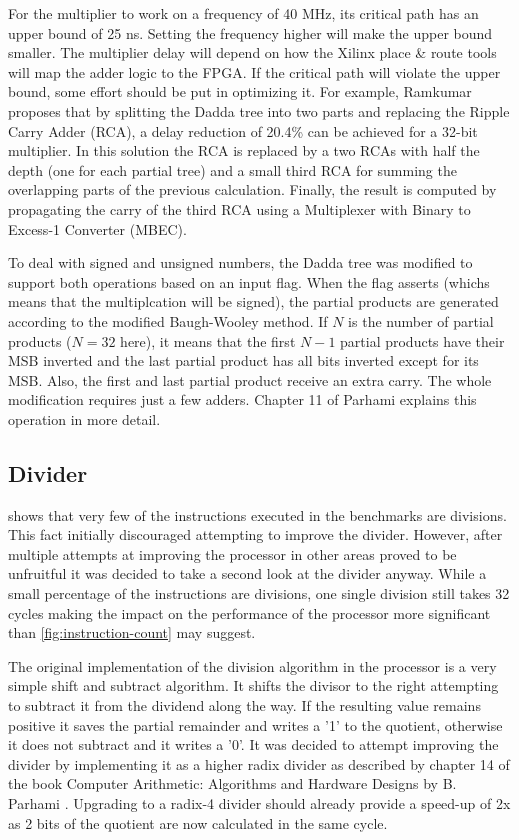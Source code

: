 \documentclass[final]{article}
\begin{document}
For the multiplier to work on a frequency of 40 MHz, its critical path has an upper bound of 25 ns. Setting the frequency higher will make the upper bound smaller. The multiplier delay will depend on how the Xilinx place \& route tools will map the adder logic to the FPGA. If the critical path will violate the upper bound, some effort should be put in optimizing it. For example, Ramkumar \cite{ramkumar} proposes that by splitting the Dadda tree into two parts and replacing the Ripple Carry Adder (RCA), a delay reduction of 20.4\% can be achieved for a 32-bit multiplier. In this solution the RCA is replaced by a two RCAs with half the depth (one for each partial tree) and a small third RCA for summing the overlapping parts of the previous calculation. Finally, the result is computed by propagating the carry of the third RCA using a Multiplexer with Binary to Excess-1 Converter (MBEC).

To deal with signed and unsigned numbers, the Dadda tree was modified to support both operations based on an input flag. When the flag asserts (whichs means that the multiplcation will be signed), the partial products are generated according to the modified Baugh-Wooley method. If $N$ is the number of partial products ($N=32$ here), it means that the first $N-1$ partial products have their MSB inverted and the last partial product has all bits inverted except for its MSB. Also, the first and last partial product receive an extra carry. The whole modification requires just a few adders. Chapter 11 of Parhami \cite{parhami} explains this operation in more detail.

\subsection{Divider}
 shows that very few of the instructions executed in the benchmarks are divisions. This fact initially discouraged attempting to improve the divider. However, after multiple attempts at improving the processor in other areas proved to be unfruitful it was decided to take a second look at the divider anyway. While a small percentage of the instructions are divisions, one single division still takes 32 cycles making the impact on the performance of the processor more significant than \cref{fig:instruction-count} may suggest. 

The original implementation of the division algorithm in the processor is a very simple shift and subtract algorithm. It shifts the divisor to the right attempting to subtract it from the dividend along the way. If the resulting value remains positive it saves the partial remainder and writes a '1' to the quotient, otherwise it does not subtract and it writes a '0'. It was decided to attempt improving the divider by implementing it as a higher radix divider as described by chapter 14 of the book Computer Arithmetic: Algorithms and Hardware Designs by B. Parhami \cite{parhami}. Upgrading to a radix-4 divider should already provide a speed-up of 2x as 2 bits of the quotient are now calculated in the same cycle.
\end{document}
